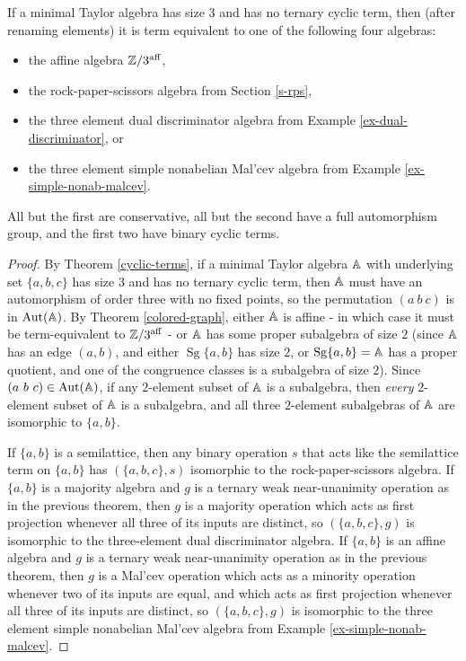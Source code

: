 \documentclass[letterpaper,11pt]{article}
\DeclareMathOperator{\Sg}{Sg}
\DeclareMathOperator{\Aut}{Aut}
\DeclareMathOperator{\aff}{aff}
\begin{document}
\begin{thm} If a minimal Taylor algebra has size $3$ and has no ternary cyclic term, then (after renaming elements) it is term equivalent to one of the following four algebras:
\begin{itemize}
\item the affine algebra $\ZZ/3^{\aff}$,
\item the rock-paper-scissors algebra from Section \ref{s-rps},
\item the three element dual discriminator algebra from Example \ref{ex-dual-discriminator}, or
\item the three element simple nonabelian Mal'cev algebra from Example \ref{ex-simple-nonab-malcev}.
\end{itemize}
All but the first are conservative, all but the second have a full automorphism group, and the first two have binary cyclic terms.
\end{thm}
\begin{proof} By Theorem \ref{cyclic-terms}, if a minimal Taylor algebra $\mathbb{A}$ with underlying set $\{a,b,c\}$ has size $3$ and has no ternary cyclic term, then $\mathbb{A}$ must have an automorphism of order three with no fixed points, so the permutation $(a\ b\ c)$ is in $\Aut(\bA)$. By Theorem \ref{colored-graph}, either $\mathbb{A}$ is affine - in which case it must be term-equivalent to $\ZZ/3^{\aff}$ - or $\mathbb{A}$ has some proper subalgebra of size $2$ (since $\mathbb{A}$ has an edge $(a,b)$, and either $\Sg\{a,b\}$ has size $2$, or $\Sg\{a,b\} = \bA$ has a proper quotient, and one of the congruence classes is a subalgebra of size $2$). Since $(a\ b\ c) \in \Aut(\bA)$, if any $2$-element subset of $\mathbb{A}$ is a subalgebra, then \emph{every} $2$-element subset of $\mathbb{A}$ is a subalgebra, and all three $2$-element subalgebras of $\mathbb{A}$ are isomorphic to $\{a,b\}$.

If $\{a,b\}$ is a semilattice, then any binary operation $s$ that acts like the semilattice term on $\{a,b\}$ has $(\{a,b,c\},s)$ isomorphic to the rock-paper-scissors algebra. If $\{a,b\}$ is a majority algebra and $g$ is a ternary weak near-unanimity operation as in the previous theorem, then $g$ is a majority operation which acts as first projection whenever all three of its inputs are distinct, so $(\{a,b,c\},g)$ is isomorphic to the three-element dual discriminator algebra. If $\{a,b\}$ is an affine algebra and $g$ is a ternary weak near-unanimity operation as in the previous theorem, then $g$ is a Mal'cev operation which acts as a minority operation whenever two of its inputs are equal, and which acts as first projection whenever all three of its inputs are distinct, so $(\{a,b,c\},g)$ is isomorphic to the three element simple nonabelian Mal'cev algebra from Example \ref{ex-simple-nonab-malcev}.
\end{proof}
\end{document}
